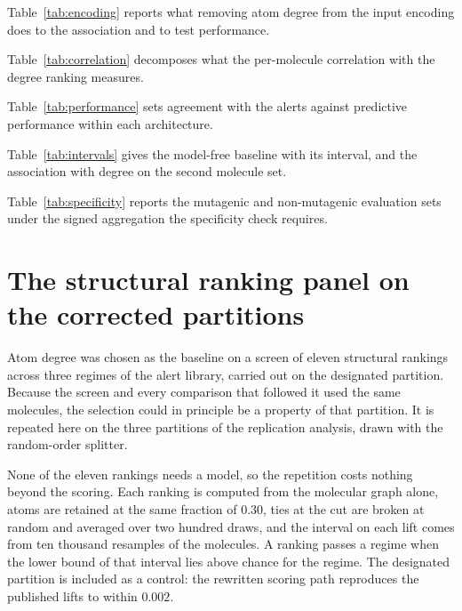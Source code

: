 \documentclass[journal=jcisd8,manuscript=suppinfo]{achemso}
\begin{document}


Table~\ref{tab:encoding} reports what removing atom degree from the input encoding does to the
association and to test performance.



Table~\ref{tab:correlation} decomposes what the per-molecule correlation with the degree
ranking measures.



Table~\ref{tab:performance} sets agreement with the alerts against predictive performance
within each architecture.



Table~\ref{tab:intervals} gives the model-free baseline with its interval, and the association
with degree on the second molecule set.



Table~\ref{tab:specificity} reports the mutagenic and non-mutagenic evaluation sets under the
signed aggregation the specificity check requires.



\section{The structural ranking panel on the corrected partitions}

Atom degree was chosen as the baseline on a screen of eleven structural rankings across three
regimes of the alert library, carried out on the designated partition. Because the screen and
every comparison that followed it used the same molecules, the selection could in principle be
a property of that partition. It is repeated here on the three partitions of the replication
analysis, drawn with the random-order splitter.

None of the eleven rankings needs a model, so the repetition costs nothing beyond the scoring.
Each ranking is computed from the molecular graph alone, atoms are retained at the same
fraction of $0.30$, ties at the cut are broken at random and averaged over two hundred draws,
and the interval on each lift comes from ten thousand resamples of the molecules. A ranking
passes a regime when the lower bound of that interval lies above chance for the regime. The
designated partition is included as a control: the rewritten scoring path reproduces the
published lifts to within $0.002$.
\end{document}

